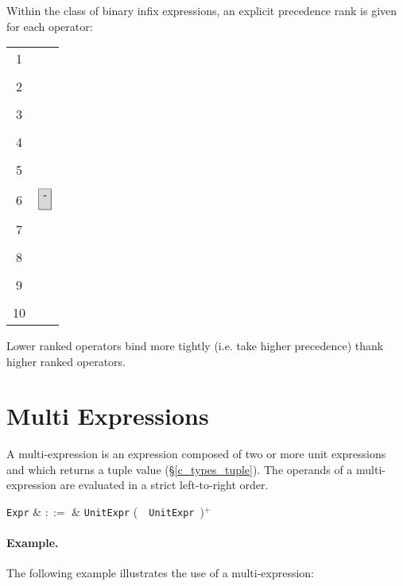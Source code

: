Within the class of binary infix expressions, an explicit precedence rank is given for each operator:

\begin{syntax}
\begin{tabular}{cl}
1 & \token{*} \token{/}\\
&\\
2 & \token{+} \token{-}\\
&\\
3 & \token{==} \token{!=} \token{<} \token{<=} \token{>=} \token{>}\\
&\\
4 & \token{\&}\\
&\\
5 & \token{|}\\
&\\
6 & $\token{\^}$\\
&\\
7 & \token{\&\&}\\
&\\
8 & \token{||}\\
&\\
9 & \token{==>}\\
&\\
10 & \token{<==>}\\
\end{tabular}
\end{syntax}

Lower ranked operators bind more tightly (i.e. take higher precedence) thank higher ranked operators.


\section{Multi Expressions}
\label{c_expr_tuple}
A multi-expression is an expression composed of two or more unit expressions and which returns a tuple value (\S\ref{c_types_tuple}).  The operands of a multi-expression are evaluated in a strict left-to-right order.

\begin{syntax}
  \verb+Expr+ & $::=$ & \verb+UnitExpr+ \big(\ \token{,}\ \verb+UnitExpr+\ \big)$^+$ \\
\end{syntax}

\paragraph{Example.}  The following example illustrates the use of a multi-expression:

